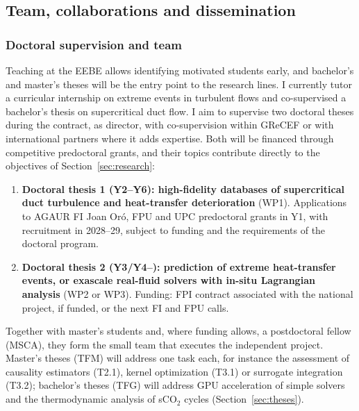 \documentclass[11pt]{article}
\begin{document}
\subsection{Team, collaborations and dissemination}\label{sec:mobility}\label{sec:dissemination}
\subsubsection*{Doctoral supervision and team}
Teaching at the EEBE allows identifying motivated students early, and bachelor's and
master's theses will be the entry point to the research lines. I currently tutor a
curricular internship on extreme events in turbulent flows and co-supervised a bachelor's
thesis on supercritical duct flow. I aim to supervise two doctoral theses during the
contract, as director, with co-supervision within GReCEF or with international partners where
it adds expertise. Both will be financed through competitive predoctoral grants, and their
topics contribute directly to the objectives of Section~\ref{sec:research}:
\begin{enumerate}
  \item \textbf{Doctoral thesis 1 (Y2--Y6): high-fidelity databases of supercritical duct
  turbulence and heat-transfer deterioration} (WP1). Applications to AGAUR FI Joan Or\'o, FPU
  and UPC predoctoral grants in Y1, with recruitment in 2028--29, subject to funding and the
  requirements of the doctoral program.
  \item \textbf{Doctoral thesis 2 (Y3/Y4--): prediction of extreme heat-transfer events, or
  exascale real-fluid solvers with in-situ Lagrangian analysis} (WP2 or WP3). Funding: FPI
  contract associated with the national project, if funded, or the next FI and FPU calls.
\end{enumerate}
Together with master's students and, where funding allows, a postdoctoral fellow (MSCA), they
form the small team that executes the independent project.
Master's theses (TFM) will address one task each, for instance the assessment of causality
estimators (T2.1), kernel optimization (T3.1) or surrogate integration (T3.2); bachelor's
theses (TFG) will address GPU acceleration of simple solvers and the thermodynamic analysis of
sCO$_2$ cycles (Section~\ref{sec:theses}).
\end{document}
